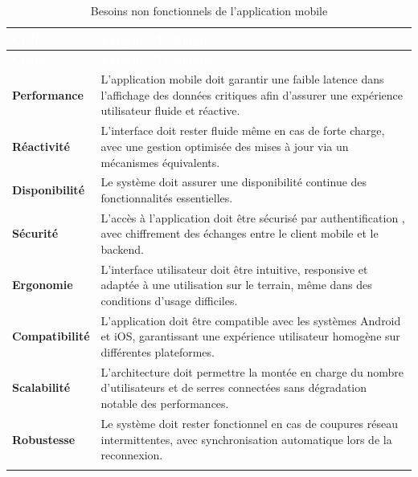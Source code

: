 \begin{longtable}{|>{\raggedright\arraybackslash}p{4cm}|>{\raggedright\arraybackslash}p{10cm}|}
	\hline
	\rowcolor[HTML]{2C3E50}
	\textcolor{white}{\textbf{Critère}} & \textcolor{white}{\textbf{Exigence Technique}}
	\\ \hline
	\endfirsthead
	
	\hline
	\rowcolor[HTML]{2C3E50}
	\textcolor{white}{\textbf{Critère}} & \textcolor{white}{\textbf{Exigence Technique}}
	\\ \hline
	\endhead
	
	\textbf{Performance} &
	L’application mobile doit garantir une faible latence dans l’affichage des données critiques afin d’assurer une expérience utilisateur fluide et réactive.
	\\ \hline
	
	\textbf{Réactivité} &
	L’interface doit rester fluide même en cas de forte charge, avec une gestion optimisée des mises à jour via un mécanismes équivalents.
	\\ \hline
	
	\textbf{Disponibilité} &
	Le système doit assurer une disponibilité continue des fonctionnalités essentielles. 
	\\ \hline
	
	\textbf{Sécurité} &
	L’accès à l’application doit être sécurisé par authentification , avec chiffrement des échanges entre le client mobile et le backend.
	\\ \hline
	
	\textbf{Ergonomie} &
	L’interface utilisateur doit être intuitive, responsive et adaptée à une utilisation sur le terrain, même dans des conditions d’usage difficiles.
	\\ \hline
	
	\textbf{Compatibilité} &
	L’application doit être compatible avec les systèmes Android et iOS, garantissant une expérience utilisateur homogène sur différentes plateformes.
	\\ \hline
	
	\textbf{Scalabilité} &
	L’architecture doit permettre la montée en charge du nombre d’utilisateurs et de serres connectées sans dégradation notable des performances.
	\\ \hline
	
	\textbf{Robustesse} &
	Le système doit rester fonctionnel en cas de coupures réseau intermittentes, avec synchronisation automatique lors de la reconnexion.
	\\ \hline
	
	\caption{Besoins non fonctionnels de l’application mobile}
	\label{tab:nf-mobile}
\end{longtable}
\endgroup

